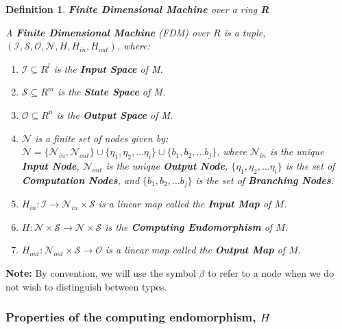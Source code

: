 \documentclass[twoside]{article}
\newcommand{\inspace}[0]{\mathcal{I}}
\newcommand{\outspace}[0]{\mathcal{O}}
\newcommand{\statespace}[0]{\mathcal{S}}
\newcommand{\nodes}[0]{\mathcal{N}}
\newcommand{\nodein}[0]{\nodes_{in}}
\newcommand{\nodeout}[0]{\nodes_{out}}
\newcommand{\set}[1]{\{#1\}}
\newcommand{\functype}[3]{$#1:#2 \rightarrow #3$}
\newcommand{\note}[1]{{\textbf{Note:} #1}}
\newtheorem{definition}[theorem]{Definition}
\begin{document}
\begin{definition}{\textbf{Finite Dimensional Machine} over a ring \textbf{R}}

  A \textbf{Finite Dimensional Machine} (FDM) over $R$ is a tuple,
  $(\inspace, \statespace, \outspace, \nodes, H, H_{in}, H_{out})$, where:

  \begin{enumerate}

  \item $\inspace \subseteq R^l$ is the \textbf{Input Space} of M.

  \item $\statespace \subseteq R^m$ is the \textbf{State Space} of M.

  \item $\outspace \subseteq R^n$ is the \textbf{Output Space} of M.

  \item $\nodes$ is a finite set of nodes given by: $ \nodes =
    \set{\nodein, \nodeout} \cup \set{\eta_1, \eta_2, \ldots \eta_i}
    \cup \set{b_1, b_2, \ldots b_j}$, where $\nodes_{in}$ is the
    unique \textbf{Input Node}, $\nodeout$ is the unique
    \textbf{Output Node}, $\set{\eta_1, \eta_2, \ldots \eta_i}$ is the
    set of \textbf{Computation Nodes}, and $ \set{b_1, b_2, \ldots b_j}$
    is the set of \textbf{Branching Nodes}.

  \item \functype{H_{in}}{\inspace}{\nodein \times \statespace} is a
    linear map called the \textbf{Input Map} of $M$.

  \item \functype{H}{\nodes \times \statespace}{\nodes \times
      \statespace} is the \textbf{Computing Endomorphism} of $M$.

  \item \functype{H_{out}}{\nodeout \times \statespace}{\outspace} is
    a linear map called the \textbf{Output Map} of $M$.

  \end{enumerate}

\end{definition}

  \note{By convention, we will use the symbol $\beta$ to refer to a node
    when we do not wish to distinguish between types.}

  \subsubsection{Properties of the computing endomorphism, $H$}
\end{document}
